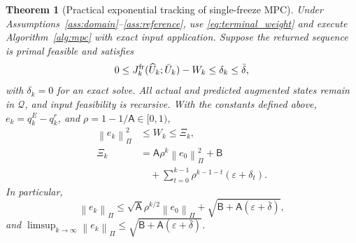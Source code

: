 \documentclass[journal]{IEEEtran}
\newtheorem{theorem}{Theorem}
\newcommand{\norm}[1]{\left\lVert #1\right\rVert}
\begin{document}
\begin{theorem}[Practical exponential tracking of single-freeze MPC]
\label{thm:tracking}
Under Assumptions~\ref{ass:domain}--\ref{ass:reference}, use \eqref{eq:terminal_weight} and execute Algorithm~\ref{alg:mpc} with exact input application. Suppose the returned sequence is primal feasible and satisfies
\begin{equation}
0\le J_k^{\rm fr}(\widehat U_k;\bar U_k)-W_k
\le\delta_k\le\bar\delta,
\label{eq:solver_gap}
\end{equation}
with $\delta_k=0$ for an exact solve. All actual and predicted augmented states remain in $\mathcal Q$, and input feasibility is recursive. With the constants defined above, $e_k=q_k^E-q_k^r$, and $\rho=1-1/\mathsf A\in[0,1)$,
\begin{equation}
\begin{split}
\norm{e_k}_\Pi^2&\le W_k\le\Xi_k,\\
\Xi_k&=\mathsf A\rho^k\norm{e_0}_\Pi^2+\mathsf B\\
&\quad+\sum_{t=0}^{k-1}\rho^{k-1-t}(\varepsilon+\delta_t).
\end{split}
\label{eq:squared_tracking_bound}
\end{equation}
In particular,
\begin{equation}
\norm{e_k}_\Pi\le\sqrt{\mathsf A}\rho^{k/2}\norm{e_0}_\Pi
+\sqrt{\mathsf B+\mathsf A(\varepsilon+\bar\delta)},
\label{eq:practical_tracking}
\end{equation}
and $\limsup_{k\to\infty}\norm{e_k}_\Pi\le
\sqrt{\mathsf B+\mathsf A(\varepsilon+\bar\delta)}$.
\end{theorem}
\end{document}
